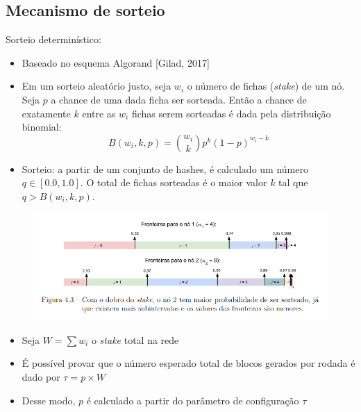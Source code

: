 \documentclass{beamer}
\begin{document}
\subsection{Mecanismo de sorteio}
\begin{frame}
Sorteio determinístico:
\begin{itemize}
    \item Baseado no esquema Algorand [Gilad, 2017]
    \item Em um sorteio aleatório justo, seja $w_i$ o número de fichas (\textit{stake}) de um nó. Seja $p$ a chance de uma dada ficha ser sorteada. Então a chance de exatamente $k$ entre as $w_i$ fichas serem sorteadas é dada pela distribuição binomial:
        \begin{equation*}
            B(w_i, k, p) = \binom{w_i}{k} p^k (1-p)^{w_i - k}
        \end{equation*}
    \item Sorteio: a partir de um conjunto de hashes, é calculado um número $q \in [0.0, 1.0]$. O total de fichas sorteadas é o maior valor $k$ tal que $q > B(w_i, k, p)$.
\end{itemize}
\end{frame}

\begin{frame}
\begin{figure}
    \centering
    \includegraphics[width=\textwidth]{images/sortition.png}
\end{figure}
\end{frame}

\begin{frame}
\begin{itemize}
    \item Seja $W = \sum w_i$ o \textit{stake} total na rede
    \item É possível provar que o número esperado total de blocos gerados por rodada é dado por $\tau = p \times W$
    \item Desse modo, $p$ é calculado a partir do parâmetro de configuração $\tau$
\end{itemize}
\end{frame}
\end{document}
